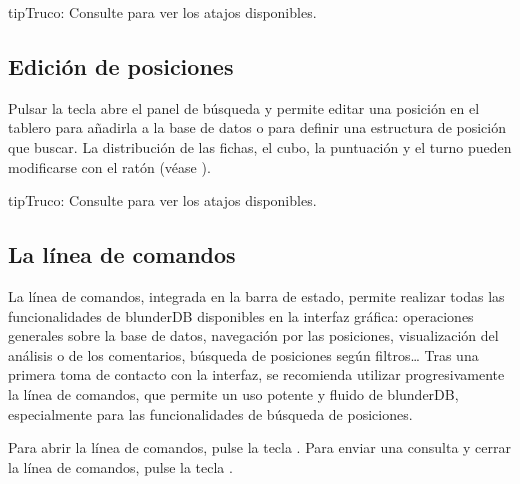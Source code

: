 \documentclass[letterpaper,10pt,spanish]{sphinxmanual}
\begin{document}
\begin{sphinxadmonition}{tip}{Truco:}
\sphinxAtStartPar
Consulte {\hyperref[\detokenize{raccourcis:raccourcis}]{}} para ver los atajos disponibles.
\end{sphinxadmonition}


\subsection{Edición de posiciones}
\label{\detokenize{manuel:edition-de-positions}}\label{\detokenize{manuel:edition-positions}}
\sphinxAtStartPar
Pulsar la tecla  abre el panel de búsqueda y permite editar una posición en el tablero para añadirla a la base de datos o para definir una estructura de posición que buscar. La distribución de las fichas, el cubo, la puntuación y el turno pueden modificarse con el ratón (véase {\hyperref[\detokenize{guide_utilisateur:guide-edit-position}]{}}).

\begin{sphinxadmonition}{tip}{Truco:}
\sphinxAtStartPar
Consulte {\hyperref[\detokenize{raccourcis:raccourcis}]{}} para ver los atajos disponibles.
\end{sphinxadmonition}


\subsection{La línea de comandos}
\label{\detokenize{manuel:la-ligne-de-commande}}\label{\detokenize{manuel:ligne-commande}}
\sphinxAtStartPar
La línea de comandos, integrada en la barra de estado, permite realizar todas las funcionalidades de blunderDB disponibles en la interfaz gráfica: operaciones generales sobre la base de datos, navegación por las posiciones, visualización del análisis o de los comentarios, búsqueda de posiciones según filtros… Tras una primera toma de contacto con la interfaz, se recomienda utilizar progresivamente la línea de comandos, que permite un uso potente y fluido de blunderDB, especialmente para las funcionalidades de búsqueda de posiciones.

\sphinxAtStartPar
Para abrir la línea de comandos, pulse la tecla . Para enviar una consulta y cerrar la línea de comandos, pulse la tecla .
\end{document}
